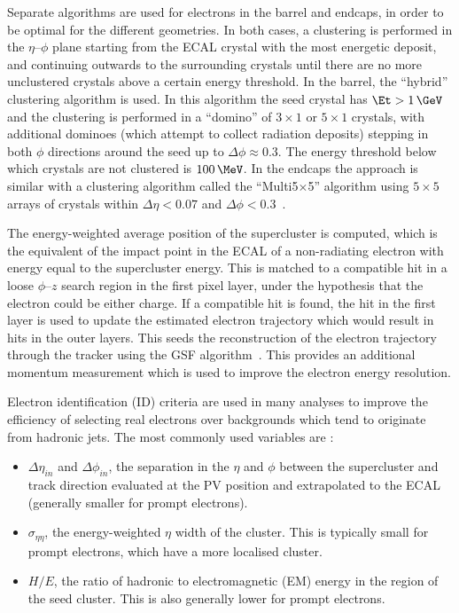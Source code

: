 Separate algorithms are used for electrons in the barrel and endcaps, in
order to be optimal for the different geometries. In both cases, a clustering is performed
in the $\eta$--$\phi$ plane starting from the \ac{ECAL} crystal with the most energetic deposit, and
continuing outwards to the surrounding crystals until there are no more
unclustered crystals above a certain energy threshold. In the barrel, the
``hybrid'' clustering algorithm is used. In this algorithm the seed crystal
has $\Et>1\,\GeV$ and the clustering is performed in a ``domino'' of $3\times1$ or
$5\times1$ crystals, with additional dominoes (which attempt to collect
radiation deposits) stepping in both $\phi$
directions around the seed up to $\Delta\phi\approx0.3$. The energy threshold
below which crystals are not clustered  is $100\,\MeV$. In the endcaps the
approach is similar with a clustering algorithm
called the ``Multi5$\times$5'' algorithm using $5\times5$ arrays of crystals within
$\Delta\eta<0.07$ and $\Delta\phi<0.3$~\cite{CMS:2013hoa}.

The energy-weighted average position of the supercluster is computed, which
is the equivalent of the impact point in the \ac{ECAL} of a
non-radiating electron with energy equal to the supercluster energy. This is
matched to a compatible hit in a loose $\phi$--$z$ search region 
in the first pixel layer, under the
hypothesis that the electron could be either charge. If a compatible hit is
found, the hit in the first layer is used to update the estimated electron
trajectory which would result in hits in the outer layers. This seeds the
reconstruction of the electron trajectory through the tracker
using the \ac{GSF} algorithm~\cite{GSFalgorithm}. This provides an additional momentum measurement
which is used to improve the electron energy resolution. 

Electron identification (ID) criteria are used in many analyses to improve the efficiency of
selecting real electrons over backgrounds which tend to originate from
hadronic jets. The most commonly used variables are \cite{Baffioni:2006cd}:

\begin{itemize}
\item $\Delta\eta_{in}$ and $\Delta\phi_{in}$, the separation in the
$\eta$ and $\phi$ between the supercluster and track direction
evaluated at the \ac{PV} position and extrapolated to the \ac{ECAL} (generally
smaller for prompt electrons).
\item $\sigma_{\eta\eta}$, the energy-weighted $\eta$ width of the cluster.
This is typically small for prompt electrons, which have a more localised
cluster.
\item $H/E$, the ratio of hadronic to electromagnetic (EM) energy in the region of
the seed cluster. This is also generally lower for prompt electrons.
\end{itemize}

